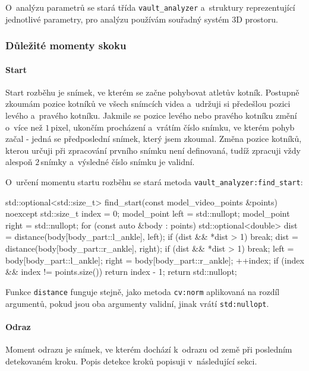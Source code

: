 O~analýzu parametrů se stará třída \texttt{vault\_analyzer} a~struktury reprezentující jednotlivé parametry, pro analýzu používám souřadný systém 3D prostoru.


\subsubsection{Důležité momenty skoku}

\paragraph{Start}

Start rozběhu je snímek, ve kterém se začne pohybovat atletův kotník. Postupně zkoumám pozice kotníků ve všech snímcích videa a~udržuji si předešlou pozici levého a~pravého kotníku. Jakmile se pozice levého nebo pravého kotníku změní o~více než $1$\,\rm pixel, ukončím procházení a~vrátím číslo snímku, ve kterém pohyb začal - jedná se předposlední snímek, který jsem zkoumal. Změna pozice kotníků, kterou určuji při zpracování prvního snímku není definovaná, tudíž zpracuji vždy alespoň $2$\,\rm snímky a~výsledné číslo snímku je validní.

O~určení momentu startu rozběhu se stará metoda \texttt{vault\_analyzer\::find\_start}:
\begin{code}[fontsize=\footnotesize]
std::optional<std::size_t> find_start(const model_video_points &points)
noexcept {
    std::size_t index = 0;
    model_point left = std::nullopt;
    model_point right = std::nullopt;
    for (const auto &body : points) {
        std::optional<double> dist =
            distance(body[body_part::l_ankle], left);
        if (dist && *dist > 1) break;
        dist = distance(body[body_part::r_ankle], right);
        if (dist && *dist > 1) break;
        left = body[body_part::l_ankle];
        right = body[body_part::r_ankle];
        ++index;
    }
    if (index && index != points.size())
        return index - 1;
    return std::nullopt;
}
\end{code}
Funkce \texttt{distance} funguje stejně, jako metoda \texttt{cv\::norm} aplikovaná na rozdíl argumentů, pokud jsou oba argumenty validní, jinak vrátí \texttt{std\::nullopt}.

\paragraph{Odraz}

Moment odrazu je snímek, ve kterém dochází k~odrazu od země při posledním detekovaném kroku. Popis detekce kroků popisuji v~následující sekci.

